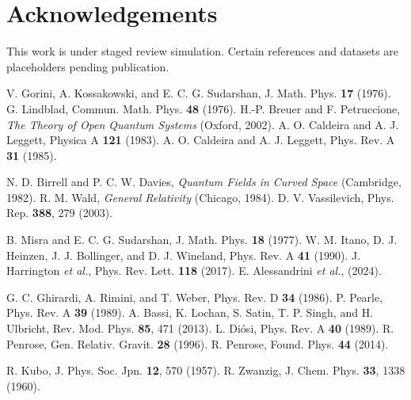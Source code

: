 \documentclass[aps,prl,twocolumn,nofootinbib]{revtex4-2}
\begin{document}
\section*{Acknowledgements}
This work is under staged review simulation. Certain references and datasets are placeholders pending publication.


\begin{thebibliography}{99}

 V. Gorini, A. Kossakowski, and E. C. G. Sudarshan, J. Math. Phys. \textbf{17} (1976).
 G. Lindblad, Commun. Math. Phys. \textbf{48} (1976).
 H.-P. Breuer and F. Petruccione, \textit{The Theory of Open Quantum Systems} (Oxford, 2002).
 A. O. Caldeira and A. J. Leggett, Physica A \textbf{121} (1983).
 A. O. Caldeira and A. J. Leggett, Phys. Rev. A \textbf{31} (1985).

 N. D. Birrell and P. C. W. Davies, \textit{Quantum Fields in Curved Space} (Cambridge, 1982).
 R. M. Wald, \textit{General Relativity} (Chicago, 1984).
 D. V. Vassilevich, Phys. Rep. \textbf{388}, 279 (2003). %

 B. Misra and E. C. G. Sudarshan, J. Math. Phys. \textbf{18} (1977).
 W. M. Itano, D. J. Heinzen, J. J. Bollinger, and D. J. Wineland, Phys. Rev. A \textbf{41} (1990).
 J. Harrington \textit{et al.}, Phys. Rev. Lett. \textbf{118} (2017). %
 E. Alessandrini \textit{et al.}, (2024). %

 G. C. Ghirardi, A. Rimini, and T. Weber, Phys. Rev. D \textbf{34} (1986).
 P. Pearle, Phys. Rev. A \textbf{39} (1989). %
 A. Bassi, K. Lochan, S. Satin, T. P. Singh, and H. Ulbricht, Rev. Mod. Phys. \textbf{85}, 471 (2013).
 L. Diósi, Phys. Rev. A \textbf{40} (1989).
 R. Penrose, Gen. Relativ. Gravit. \textbf{28} (1996).
 R. Penrose, Found. Phys. \textbf{44} (2014).

 R. Kubo, J. Phys. Soc. Jpn. \textbf{12}, 570 (1957).
 R. Zwanzig, J. Chem. Phys. \textbf{33}, 1338 (1960).


\end{thebibliography}
\end{document}
